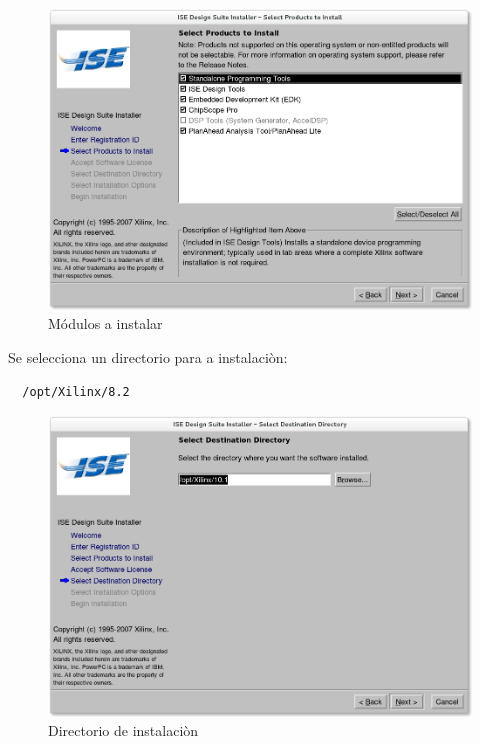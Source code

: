 \begin{figure}[ht]
  \begin{center}
 \includegraphics[scale=.40]{./figuras/Modules_install.png}
  \caption{Módulos a instalar}
 \label{Módulos a instalar ISE 8.2}
 \end{center}
\end{figure}

Se selecciona un directorio para a instalaciòn:

  \begin{verbatim}
  /opt/Xilinx/8.2 
  \end{verbatim}
  
  \begin{figure}[ht]
  \begin{center}
 \includegraphics[scale=.40]{./figuras/Directory.png}
  \caption{Directorio de instalaciòn}
 \label{Directorio de instalaciòn ISE 8.2}
 \end{center}
\end{figure}

